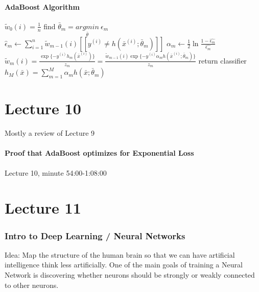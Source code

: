 \documentclass[12pt]{article}
\begin{document}
\newpage

\subsection{AdaBoost Algorithm}

\begin{algorithm} \label{alg:AdaBoost}
\caption{AdaBoost}
\begin{algorithmic}
		\State $\widetilde{w}_0(i) = \frac 1 n$
	\EndFor
		\State find $\bar{\theta}_m = \underset{\bar{\theta}}{argmin} ~ \epsilon_m$
		\State $\hat{\epsilon}_m \gets \sum_{i=1}^n \widetilde{w}_{m-1} (i) [[y^{(i)} \ne h(\bar{x}^{(i)}; \bar{\theta}_m)]]$
		\State $\alpha_m \gets \frac 1 2 \ln \frac {1 - \hat{\epsilon_m}} {\hat{\epsilon_m}}$
		\State $\widetilde{w}_m(i) = \frac {\exp\{ -y^{(i)} h_m(\bar x^{(i)}) \}} {z_m} = \frac {\widetilde{w}_{m-1}(i) \exp\{ -y^{(i)} \alpha_m h(\bar x^{(i)}; \bar{\theta}_m) \}} {z_m}$ 
		\EndFor
	\EndFor
	\State return classifier $h_M(\bar x) = \sum_{m = 1}^M \alpha_m h(\bar x; \bar{\theta}_m)$
\end{algorithmic}
\end{algorithm}

\part{Lecture 10}

Mostly a review of Lecture 9

\subsection{Proof that AdaBoost optimizes for Exponential Loss}

Lecture 10, minute 54:00-1:08:00

\part{Lecture 11}

\section{Intro to Deep Learning / Neural Networks}

Idea: Map the structure of the human brain so that we can have artificial intelligence think less artificially. One of the main goals of training a Neural Network is discovering whether neurons should be strongly or weakly connected to other neurons.
\end{document}
